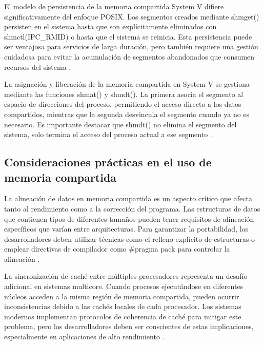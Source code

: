 {El modelo de persistencia de la memoria compartida System V difiere significativamente del enfoque POSIX. Los segmentos creados mediante shmget() persisten en el sistema hasta que son explícitamente eliminados con shmctl(IPC\_RMID) o hasta que el sistema se reinicia. Esta persistencia puede ser ventajosa para servicios de larga duración, pero también requiere una gestión cuidadosa para evitar la acumulación de segmentos abandonados que consumen recursos del sistema \cite{love2013linux}.
\vspace{10pt}

La asignación y liberación de la memoria compartida en System V se gestiona mediante las funciones shmat() y shmdt(). La primera asocia el segmento al espacio de direcciones del proceso, permitiendo el acceso directo a los datos compartidos, mientras que la segunda desvincula el segmento cuando ya no es necesario. Es importante destacar que shmdt() no elimina el segmento del sistema, solo termina el acceso del proceso actual a ese segmento \cite{tanenbaum2015modern}.

\subsection{Consideraciones prácticas en el uso de memoria compartida}

La alineación de datos en memoria compartida es un aspecto crítico que afecta tanto al rendimiento como a la corrección del programa. Las estructuras de datos que contienen tipos de diferentes tamaños pueden tener requisitos de alineación específicos que varían entre arquitecturas. Para garantizar la portabilidad, los desarrolladores deben utilizar técnicas como el relleno explícito de estructuras o emplear directivas de compilador como \#pragma pack para controlar la alineación \cite{drepper2007every}.
\vspace{10pt}

La sincronización de caché entre múltiples procesadores representa un desafío adicional en sistemas multicore. Cuando procesos ejecutándose en diferentes núcleos acceden a la misma región de memoria compartida, pueden ocurrir inconsistencias debido a las cachés locales de cada procesador. Los sistemas modernos implementan protocolos de coherencia de caché para mitigar este problema, pero los desarrolladores deben ser conscientes de estas implicaciones, especialmente en aplicaciones de alto rendimiento \cite{herlihy2012art}.
\vspace{10pt}

}
